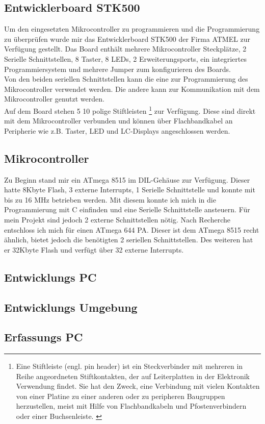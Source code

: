\subsection{Entwicklerboard STK500}
Um den eingesetzten Mikrocontroller zu programmieren und die Programmierung zu überprüfen wurde mir das Entwicklerboard STK500 der Firma ATMEL zur Verfügung gestellt. Das Board enthält mehrere Mikrocontroller Steckplätze, 2 Serielle Schnittstellen, 8 Taster, 8 LEDs, 2 Erweiterungsports, ein integriertes Programmiersystem  und mehrere Jumper zum konfigurieren des Boards.\\
Von den beiden seriellen Schnittstellen kann die eine zur Programmierung des Mikrocontroller verwendet werden. Die andere kann zur Kommunikation mit dem Mikrocontroller genutzt werden.\\
Auf dem Board stehen 5 10 polige Stiftleisten 
\footnote{Eine Stiftleiste (engl. pin header) ist ein Steckverbinder mit mehreren in Reihe angeordneten Stiftkontakten, der auf Leiterplatten in der Elektronik Verwendung findet. Sie hat den Zweck, eine Verbindung mit vielen Kontakten von einer Platine zu einer anderen oder zu peripheren Baugruppen herzustellen, meist mit Hilfe von Flachbandkabeln und Pfostenverbindern oder einer Buchsenleiste. \cite{wiki_pinh} }
zur Verfügung. Diese sind direkt mit dem Mikrocontroller verbunden und können über Flachbandkabel an Peripherie wie z.B. Taster, LED und LC-Displays angeschlossen werden.

\subsection{Mikrocontroller}
Zu Beginn stand mir ein ATmega 8515\cite{atmel_8515} im DIL-Gehäuse zur Verfügung. Dieser hatte 8Kbyte Flash, 3 externe Interrupts, 1 Serielle Schnittstelle und konnte mit bis zu 16 MHz betrieben werden. Mit diesem konnte ich mich in die Programmierung mit C einfinden und eine Serielle Schnittstelle ansteuern. Für mein Projekt sind jedoch 2 externe Schnittstellen nötig. Nach Recherche entschloss ich mich für einen ATmega 644 PA.  Dieser ist dem ATmega 8515 recht ähnlich, bietet jedoch die benötigten 2 seriellen Schnittstellen. Des weiteren hat er 32Kbyte Flash und verfügt über 32 externe Interrupts. 
\subsection{Entwicklungs PC}
\subsection{Entwicklungs Umgebung}
\subsection{Erfassungs PC}